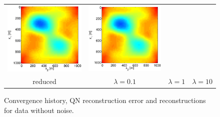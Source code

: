 \documentclass{iopart}
\begin{document}
\begin{figure}
\begin{tabular}{cccc}
\includegraphics[scale=.2]{./figs/2D_exp2_g}&
\includegraphics[scale=.2]{./figs/2D_exp2_h}\\
{\small reduced}&{\small $\lambda=0.1$}&{\small $\lambda=1$}&{\small $\lambda=10$}\\
\end{tabular}
\caption{Convergence history, QN reconstruction error and reconstructions for data without noise.}
\label{fig:2D_exp2}
\end{figure}
\end{document}
